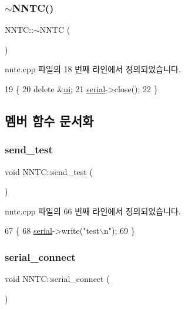 \subsubsection{\texorpdfstring{$\sim$\+N\+N\+T\+C()}{~NNTC()}}
{\footnotesize\ttfamily N\+N\+T\+C\+::$\sim$\+N\+N\+TC (\begin{DoxyParamCaption}{ }\end{DoxyParamCaption})}



nntc.\+cpp 파일의 18 번째 라인에서 정의되었습니다.


\begin{DoxyCode}
19 \{
20     \textcolor{keyword}{delete} &\mbox{\hyperlink{class_n_n_t_c_aafbe297818dd00b2c0f791ebb06292a4}{ui}};
21     \mbox{\hyperlink{nntc_8cpp_ae6fc1d9226a3b8046c907909a550dbe7}{serial}}->close();
22 \}
\end{DoxyCode}


\subsection{멤버 함수 문서화}
\mbox{\label{class_n_n_t_c_a7734a6d097beaf07c27e46af0987d59a}} 
\subsubsection{\texorpdfstring{send\+\_\+test}{send\_test}}
{\footnotesize\ttfamily void N\+N\+T\+C\+::send\+\_\+test (\begin{DoxyParamCaption}{ }\end{DoxyParamCaption})\hspace{0.3cm}{\ttfamily [slot]}}



nntc.\+cpp 파일의 66 번째 라인에서 정의되었습니다.


\begin{DoxyCode}
67 \{
68     \mbox{\hyperlink{nntc_8cpp_ae6fc1d9226a3b8046c907909a550dbe7}{serial}}->write(\textcolor{stringliteral}{"test\(\backslash\)n"});
69 \}
\end{DoxyCode}
\mbox{\label{class_n_n_t_c_ae9613ae3c1668e30610e0104e8e53d40}} 
\subsubsection{\texorpdfstring{serial\+\_\+connect}{serial\_connect}}
{\footnotesize\ttfamily void N\+N\+T\+C\+::serial\+\_\+connect (\begin{DoxyParamCaption}{ }\end{DoxyParamCaption})\hspace{0.3cm}{\ttfamily [slot]}}



